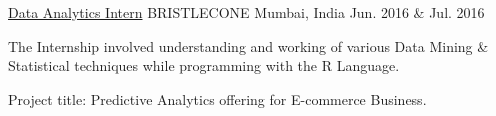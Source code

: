 \begin{cventries}

\cventry
{\underline {Data Analytics Intern}} %
{BRISTLECONE} %
{Mumbai, India} %
{Jun. 2016 \& Jul. 2016} %
{ %
\begin{cvitems}
\item{The Internship involved understanding and working of various Data Mining \& Statistical techniques while programming with the R Language.}
\item{Project title: Predictive Analytics offering for E-commerce Business.}
\end{cvitems}
\vspace{-1.2\baselineskip} 
}



\end{cventries}
